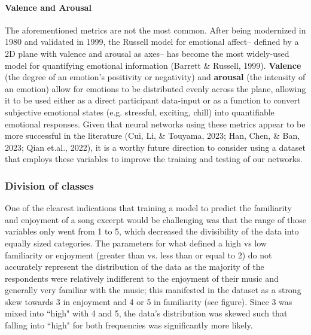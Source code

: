 \documentclass[fleqn,10pt]{SelfArx} %
\begin{document}
\paragraph{Valence and Arousal}
The aforementioned metrics are not the most common. After being modernized in 1980 and validated in 1999, the Russell model for emotional affect-- defined by a 2D plane with valence and arousal as axes-- has become the most widely-used model for quantifying emotional information (Barrett \& Russell, 1999). \textbf{Valence} (the degree of an emotion's positivity or negativity) and \textbf{arousal} (the intensity of an emotion) allow for emotions to be distributed evenly across the plane, allowing it to be used either as a direct participant data-input or as a function to convert subjective emotional states (e.g. stressful, exciting, chill) into quantifiable emotional responses. Given that neural networks using these metrics appear to be more successful in the literature (Cui, Li, \& Touyama, 2023; Han, Chen, \& Ban, 2023; Qian et.al., 2022), it is a worthy future direction to consider using a dataset that employs these variables to improve the training and testing of our networks.

\subsubsection{Division of classes}

One of the clearest indications that training a model to predict the familiarity and enjoyment of a song excerpt would be challenging was that the range of those variables only went from 1 to 5, which decreased the divisibility of the data into equally sized categories. The parameters for what defined a high vs low familiarity or enjoyment (greater than vs. less than or equal to 2) do not accurately represent the distribution of the data as the majority of the respondents were relatively indifferent to the enjoyment of their music and generally very familiar with the music; this manifested in the dataset as a strong skew towards 3 in enjoyment and 4  or 5 in familiarity (see figure). Since 3 was mixed into ``high" with 4 and 5, the data's distribution was skewed such that falling into ``high" for both frequencies was significantly more likely. 
\end{document}
